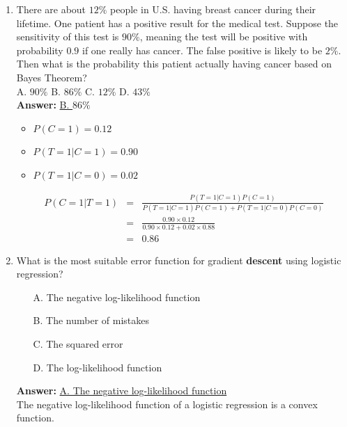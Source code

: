\documentclass{article}
\begin{document}
\begin{enumerate}
	\item There are about $12\%$ people in U.S. having breast cancer during their lifetime. One patient has a positive result for the medical test. Suppose the sensitivity of this test is $90\%$, meaning the test will be positive with probability $0.9$ if one really has cancer. The false positive is likely to be $2\%$. Then what is the probability this patient actually having cancer based on Bayes Theorem?\\
	A. $90\%$ \hspace{0.1\textwidth} B. $86\%$ \hspace{0.1\textwidth} C. $12\%$ \hspace{0.1\textwidth} D. $43\%$\\
	\textbf{Answer:}
	\underline{B. $86\%$}\\
	\begin{itemize}
		\item $P(C=1)=0.12$
		\item $P(T=1|C=1)=0.90$
		\item $P(T=1|C=0)=0.02$
	\end{itemize}
	\begin{equation}
	\nonumber
	\begin{array}{rcl}
		P(C=1|T=1) &　=　& \frac{P(T=1|C=1)P(C=1)}{P(T=1|C=1)P(C=1)+P(T=1|C=0)P(C=0)} \\
				   & = & \frac{0.90\times0.12}{0.90\times0.12+0.02\times0.88} \\
				   & = & 0.86
	\end{array}
	\end{equation}
	
	\item What is the most suitable error function for gradient \textbf{descent} using logistic regression?
	\begin{itemize}
		\item [A.] The negative log-likelihood function
		\item [B.] The number of mistakes
		\item [C.] The squared error
		\item [D.] The log-likelihood function
	\end{itemize}
	\textbf{Answer:}
	\underline{A. The negative log-likelihood function}\\
	The negative log-likelihood function of a logistic regression is a convex function.
\end{enumerate}


\newpage
\end{document}
